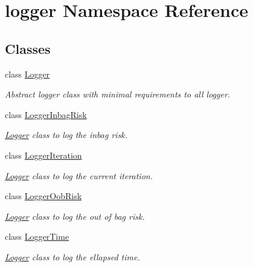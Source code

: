 \hypertarget{namespacelogger}{}\section{logger Namespace Reference}
\label{namespacelogger}
\subsection*{Classes}
\begin{DoxyCompactItemize}
\item 
class \hyperlink{classlogger_1_1_logger}{Logger}
\begin{DoxyCompactList}\small\item\em Abstract logger class with minimal requirements to all logger. \end{DoxyCompactList}\item 
class \hyperlink{classlogger_1_1_logger_inbag_risk}{Logger\+Inbag\+Risk}
\begin{DoxyCompactList}\small\item\em \hyperlink{classlogger_1_1_logger}{Logger} class to log the inbag risk. \end{DoxyCompactList}\item 
class \hyperlink{classlogger_1_1_logger_iteration}{Logger\+Iteration}
\begin{DoxyCompactList}\small\item\em \hyperlink{classlogger_1_1_logger}{Logger} class to log the current iteration. \end{DoxyCompactList}\item 
class \hyperlink{classlogger_1_1_logger_oob_risk}{Logger\+Oob\+Risk}
\begin{DoxyCompactList}\small\item\em \hyperlink{classlogger_1_1_logger}{Logger} class to log the out of bag risk. \end{DoxyCompactList}\item 
class \hyperlink{classlogger_1_1_logger_time}{Logger\+Time}
\begin{DoxyCompactList}\small\item\em \hyperlink{classlogger_1_1_logger}{Logger} class to log the ellapsed time. \end{DoxyCompactList}\end{DoxyCompactItemize}
